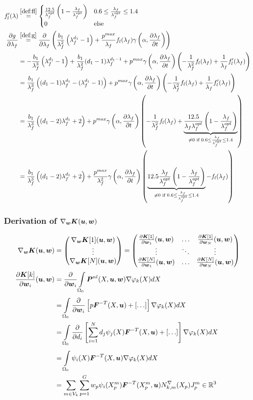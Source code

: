 \begin{align*}
	  f_l'(\lambda) &\re{def:fl} \begin{cases}
		\frac{12.5}{\lfo}\left(1-\frac{\lambda_f}{\lfo}\right) & 0.6 \leq \frac{\lambda_f}{\lfo} \leq 1.4\\ 
		0 & \text{else}
	\end{cases}\\	
	   \d{g}{\lambda_f} &\re{def:g} \d{}{\lambda_f}\left(\frac{b_1}{\lambda_f^2}\left(\lambda_f^{d_1} - 1\right)
		+\frac{p^{max}}{\lambda_f}f_l(\lambda_f)\gamma\left(\alpha,\d{\lambda_f}{t}\right)\right)\\
		&= -\frac{b_1}{\lambda_f^3}\left(\lambda_f^{d_1} - 1\right) + \frac{b_1}{\lambda_f^2}(d_1-1)\lambda_f^{d_1-1}
		+p^{max}\gamma\left(\alpha,\d{\lambda_f}{t}\right) \left(-\frac{1}{\lambda_f^2}f_l(\lambda_f) + \frac{1}{\lambda_f}f_l'(\lambda_f)\right)\\
		&= \frac{b_1}{\lambda_f^3}\left((d_1-1)\lambda_f^{d_1} - (\lambda_f^{d_1} - 1)\right)
		+p^{max}\gamma\left(\alpha,\d{\lambda_f}{t}\right) \left(-\frac{1}{\lambda_f^2}f_l(\lambda_f) + \frac{1}{\lambda_f}f_l'(\lambda_f)\right)\\
		&= \frac{b_1}{\lambda_f^3}\left((d_1-2)\lambda_f^{d_1} + 2\right)
		+p^{max}\gamma\left(\alpha,\d{\lambda_f}{t}\right) \left(-\frac{1}{\lambda_f^2}f_l(\lambda_f) 
		+ \underbrace{\frac{12.5}{\lambda_f\lfo}\left(1-\frac{\lambda_f}{\lfo}\right)}_{\neq 0\text{ if }0.6 \leq \frac{\lambda_f}{\lfo} \leq 1.4}\right)\\
		&= \frac{b_1}{\lambda_f^3}\left((d_1-2)\lambda_f^{d_1} + 2\right)
		+ \frac{p^{max}}{\lambda_f^2}\gamma\left(\alpha,\d{\lambda_f}{t}\right) \left( 
		\underbrace{12.5\frac{\lambda_f}{\lfo}\left(1-\frac{\lambda_f}{\lfo}\right)}_{\neq 0\text{ if }0.6 \leq \frac{\lambda_f}{\lfo} \leq 1.4}-f_l(\lambda_f)\right)
\end{align*}

\subsubsection{Derivation of $\nabla_{\boldsymbol{w}}\boldsymbol{K}(\boldsymbol{u},\boldsymbol{w})$}
\begin{align*}
	\nabla_{\boldsymbol{w}}\boldsymbol{K}(\boldsymbol{u},\boldsymbol{w}) &= \left(\begin{matrix}\nabla_{\boldsymbol{w}}\boldsymbol{K}[1](\boldsymbol{u},\boldsymbol{w})\\ \vdots \\ \nabla_{\boldsymbol{w}}\boldsymbol{K}[N](\boldsymbol{u},\boldsymbol{w})\end{matrix}\right)
	 = \left(\begin{matrix}\frac{\partial \boldsymbol{K}[1]}{\partial \boldsymbol{w}_1}(\boldsymbol{u},\boldsymbol{w}) & \ldots & \frac{\partial \boldsymbol{K}[1]}{\partial \boldsymbol{w}_N}(\boldsymbol{u},\boldsymbol{w})\\
	 	\vdots & \ddots & \vdots\\
	   \frac{\partial \boldsymbol{K}[N]}{\partial \boldsymbol{w}_1}(\boldsymbol{u},\boldsymbol{w}) & \ldots & \frac{\partial \boldsymbol{K}[N]}{\partial \boldsymbol{w}_N}(\boldsymbol{u},\boldsymbol{w})\end{matrix}\right)\\
	\frac{\partial \boldsymbol{K}[k]}{\partial \boldsymbol{w}_i}(\boldsymbol{u},\boldsymbol{w}) &= \frac{\partial }{\partial \boldsymbol{w}_i} \int\limits_{\Omega_0}^{}\boldsymbol{P}^{nl}(X,\boldsymbol{u},\boldsymbol{w})\nabla\varphi_{k}(X) dX\\
		&=  \int\limits_{\Omega_0}^{}\frac{\partial }{\partial \boldsymbol{w}_i} \left[p\boldsymbol{F}^{-T}(X,\boldsymbol{u}) +[\ldots] \right] \nabla\varphi_{k}(X) dX\\
		&=  \int\limits_{\Omega_0}^{}\frac{\partial }{\partial d_i} \left[\sum\limits_{i=1}^{N} d_j\psi_j(X)\boldsymbol{F}^{-T}(X,\boldsymbol{u}) +[\ldots] \right] \nabla\varphi_{k}(X) dX\\
		&=  \int\limits_{\Omega_0}^{} \psi_i(X)\boldsymbol{F}^{-T}(X,\boldsymbol{u})\nabla\varphi_{k}(X) dX\\
		&= \sum\limits_{m\in V_k}^{}\sum\limits_{p=1}^{G} w_p \psi_i(X^m_p)\boldsymbol{F}^{-T}(X^m_p,\boldsymbol{u}) N^\nabla_{k,m}(X_p)J^m_p\in\mathbb{R}^3
\end{align*}


